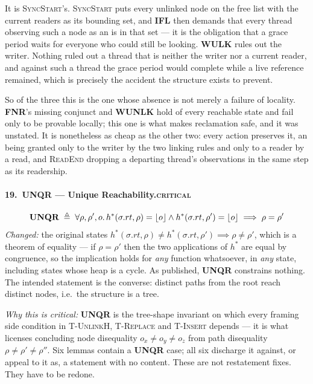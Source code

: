 It is \textsc{SyncStart}'s.  \textsc{SyncStart} puts every unlinked node on the
free list with the current readers as its bounding set, and \textbf{IFL} then
demands that every thread observing such a node as an \itr{} is in that set ---
it is the obligation that a grace period waits for everyone who could still be
looking.  \textbf{WULK} rules out the writer.  Nothing ruled out a thread that
is neither the writer nor a current reader, and against such a thread the grace
period would complete while a live reference remained, which is precisely the
accident the structure exists to prevent.

So of the three this is the one whose absence is not merely a failure of
locality.  \textbf{FNR}'s missing conjunct and \textbf{WUNLK} hold of every
reachable state and fail only to be provable locally; this one is what makes
reclamation safe, and it was unstated.  It is nonetheless as cheap as the other
two: every action preserves it, an \itr{} being granted only to the writer by
the two linking rules and only to a reader by a read, and \textsc{ReadEnd}
dropping a departing thread's observations in the same step as its readership.

\paragraph{19.\ UNQR --- Unique Reachability.\hfill\textsc{critical}}
\[
\textbf{UNQR} \;\triangleq\; \forall \rho,\rho',o \ldotp
  h^{*}(\sigma.rt,\rho) = \lfloor o \rfloor \land h^{*}(\sigma.rt,\rho') = \lfloor o \rfloor
  \implies \rho = \rho'
\]
\emph{Changed:} the original states
$h^{*}(\sigma.rt,\rho) \neq h^{*}(\sigma.rt,\rho') \implies \rho \neq \rho'$,
which is a theorem of equality --- if $\rho = \rho'$ then the two applications
of $h^{*}$ are equal by congruence, so the implication holds for \emph{any}
function whatsoever, in \emph{any} state, including states whose heap is a
cycle.  As published, \textbf{UNQR} constrains nothing.  The intended statement
is the converse: distinct paths from the root reach distinct nodes, i.e.\ the
structure is a tree.

\emph{Why this is critical:} \textbf{UNQR} is the tree-shape invariant on which
every framing side condition in \textsc{T-UnlinkH}, \textsc{T-Replace} and
\textsc{T-Insert} depends --- it is what licenses concluding node disequality
$o_x \neq o_y \neq o_z$ from path disequality $\rho \neq \rho' \neq \rho''$.
Six lemmas contain a \textbf{UNQR} case; all six discharge it against, or appeal
to it as, a statement with no content.  These are not restatement fixes.  They
have to be redone.

